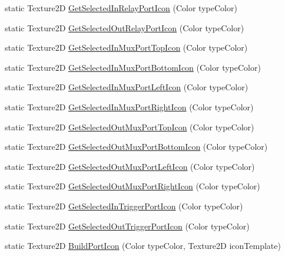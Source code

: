\begin{DoxyCompactItemize}
\item 
static Texture2\+D \hyperlink{classi_c_s___port_icons_a085d7b2c1ee096002e802291dd49a841}{Get\+Selected\+In\+Relay\+Port\+Icon} (Color type\+Color)
\item 
static Texture2\+D \hyperlink{classi_c_s___port_icons_aba6e9d670e5a753deb8d76353b6a9222}{Get\+Selected\+Out\+Relay\+Port\+Icon} (Color type\+Color)
\item 
static Texture2\+D \hyperlink{classi_c_s___port_icons_a96b1c707aefcfe4827d5bf0f093d4d6e}{Get\+Selected\+In\+Mux\+Port\+Top\+Icon} (Color type\+Color)
\item 
static Texture2\+D \hyperlink{classi_c_s___port_icons_a45fe4233cc66dc353b74dae070d706bd}{Get\+Selected\+In\+Mux\+Port\+Bottom\+Icon} (Color type\+Color)
\item 
static Texture2\+D \hyperlink{classi_c_s___port_icons_a9dd798206daab0314f8e943040ca8aef}{Get\+Selected\+In\+Mux\+Port\+Left\+Icon} (Color type\+Color)
\item 
static Texture2\+D \hyperlink{classi_c_s___port_icons_a09b9d51a20fd9c7439fd78a88acecf75}{Get\+Selected\+In\+Mux\+Port\+Right\+Icon} (Color type\+Color)
\item 
static Texture2\+D \hyperlink{classi_c_s___port_icons_ab0de5128beaa7213443a1d88d9ad8f26}{Get\+Selected\+Out\+Mux\+Port\+Top\+Icon} (Color type\+Color)
\item 
static Texture2\+D \hyperlink{classi_c_s___port_icons_aff7db6523d2728f7d5142cbad0a4e34e}{Get\+Selected\+Out\+Mux\+Port\+Bottom\+Icon} (Color type\+Color)
\item 
static Texture2\+D \hyperlink{classi_c_s___port_icons_a40266c5b117cd8cb80d9d3afa60c5020}{Get\+Selected\+Out\+Mux\+Port\+Left\+Icon} (Color type\+Color)
\item 
static Texture2\+D \hyperlink{classi_c_s___port_icons_a28432596b336a761e92713c2666f3cc1}{Get\+Selected\+Out\+Mux\+Port\+Right\+Icon} (Color type\+Color)
\item 
static Texture2\+D \hyperlink{classi_c_s___port_icons_afa9c68c0d7533d06d677124558b33d05}{Get\+Selected\+In\+Trigger\+Port\+Icon} (Color type\+Color)
\item 
static Texture2\+D \hyperlink{classi_c_s___port_icons_af5ea8ef1d656ecb99df54e5670a8cb47}{Get\+Selected\+Out\+Trigger\+Port\+Icon} (Color type\+Color)
\item 
static Texture2\+D \hyperlink{classi_c_s___port_icons_a98374207c6778310ffcdf7a59e0cc302}{Build\+Port\+Icon} (Color type\+Color, Texture2\+D icon\+Template)
\end{DoxyCompactItemize}



